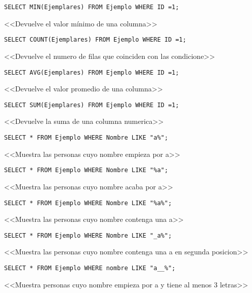 \documentclass[a4paper, 11pt, titlepage]{article}
\begin{document}
\begin{verbatim}
SELECT MIN(Ejemplares) FROM Ejemplo WHERE ID =1;
\end{verbatim}
<<Devuelve el valor mínimo de una columna>> 
\begin{verbatim}
SELECT COUNT(Ejemplares) FROM Ejemplo WHERE ID =1;
\end{verbatim}
<<Devuelve el numero de filas que coinciden con las condicione>> 
\begin{verbatim}
SELECT AVG(Ejemplares) FROM Ejemplo WHERE ID =1;
\end{verbatim}
<<Devuelve el valor promedio de una columna>> 
\begin{verbatim}
SELECT SUM(Ejemplares) FROM Ejemplo WHERE ID =1;
\end{verbatim}
<<Devuelve la suma de una columna numerica>> 
\begin{verbatim}
SELECT * FROM Ejemplo WHERE Nombre LIKE "a%";
\end{verbatim}
<<Muestra las personas cuyo nombre empieza por a>> 
\begin{verbatim}
SELECT * FROM Ejemplo WHERE Nombre LIKE "%a";
\end{verbatim}
<<Muestra las personas cuyo nombre acaba por a>> 
\begin{verbatim}
SELECT * FROM Ejemplo WHERE Nombre LIKE "%a%";
\end{verbatim}
<<Muestra las personas cuyo nombre contenga una a>> 
\begin{verbatim}
SELECT * FROM Ejemplo WHERE Nombre LIKE "_a%";
\end{verbatim}
<<Muestra las personas cuyo nombre contenga una a en segunda posicion>> 
\begin{verbatim}
SELECT * FROM Ejemplo WHERE nombre LIKE "a__%";
\end{verbatim}    
<<Muestra personas cuyo nombre empieza por a y tiene al menos 3 letras>>

\newpage
\end{document}
